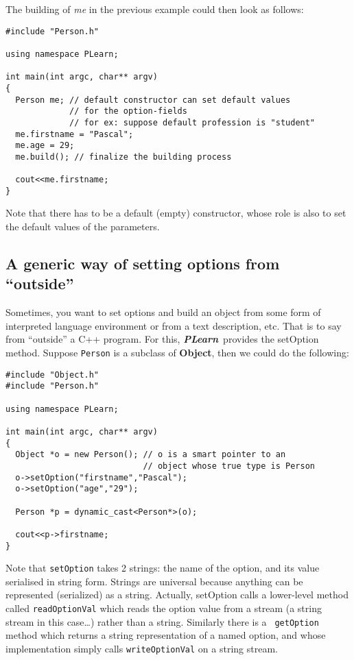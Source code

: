 \documentclass[11pt]{book}
\newcommand{\PLearn}{{\bf \it PLearn}}
\newcommand{\Object}{{\bf Object}}
\begin{document}
The building of {\em me} in the previous example could then look
as follows:

\begin{verbatim}
#include "Person.h"

using namespace PLearn;

int main(int argc, char** argv)
{
  Person me; // default constructor can set default values 
             // for the option-fields
             // for ex: suppose default profession is "student"
  me.firstname = "Pascal";
  me.age = 29;
  me.build(); // finalize the building process

  cout<<me.firstname; 
}
\end{verbatim}

Note that there has to be a default (empty) constructor, whose role is also
to set the default values of the parameters.


\subsection{A generic way of setting options from ``outside''}

Sometimes, you want to set options and build an object from some
form of interpreted language environment or from a text description,
etc. That is to say from ``outside'' a C++ program. For this, \PLearn\ 
provides the setOption method. Suppose {\tt Person} is a subclass of
\Object, then we could do the following:

\begin{verbatim}
#include "Object.h"
#include "Person.h"

using namespace PLearn;

int main(int argc, char** argv)
{
  Object *o = new Person(); // o is a smart pointer to an 
                            // object whose true type is Person
  o->setOption("firstname","Pascal");
  o->setOption("age","29");

  Person *p = dynamic_cast<Person*>(o);

  cout<<p->firstname;
}
\end{verbatim}

Note that {\tt setOption} takes 2 strings: the name of the option, and
its value serialised in string form. Strings are universal because
anything can be represented (serialized) as a string. Actually,
setOption calls a lower-level method called {\tt readOptionVal}
which reads the option value from a stream (a string stream in
this case\ldots) rather than a string. Similarly there is a {\tt
getOption} method which returns a string representation of a named
option, and whose implementation simply calls {\tt writeOptionVal}
on a string stream.
\end{document}
